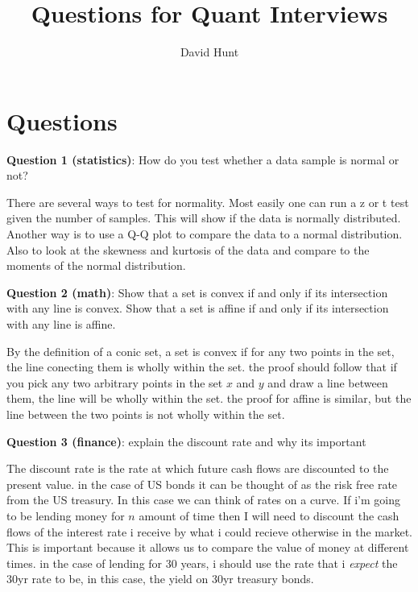 \documentclass[a4paper,10pt]{article}
\title{Questions for Quant Interviews} %
\author{David Hunt} %
\begin{document}
\maketitle

\section*{Questions}

\textbf{Question 1 (statistics)}: How do you test whether a data sample is normal or not?
\vspace{0.25cm} 
\noindent
\begin{sloppypar}
        There are several ways to test for normality. Most easily one can run a z or t test given the number of samples. 
        This will show if the data is normally distributed. Another way is to use a Q-Q plot to compare the data to a normal distribution.
        Also to look at the skewness and kurtosis of the data and compare to the moments of the normal distribution.
\end{sloppypar}
\vspace{0.5cm} 
\noindent
\textbf{Question 2 (math)}: Show that a set is convex if and only if its intersection with any line is convex. Show that a set is affine if and only if its intersection with any line is affine.
\vspace{0.25cm} 
\noindent
\begin{sloppypar}
        By the definition of a conic set, a set is convex if for any two points in the set, the line conecting them is wholly within the set.
        the proof should follow that if you pick any two arbitrary points in the set $x$ and $y$ and draw a line between them, the line will be wholly within the set.
        the proof for affine is similar, but the line between the two points is not wholly within the set.
\end{sloppypar}
\vspace{0.5cm} 
\noindent
\textbf{Question 3 (finance)}: explain the discount rate and why its important 
\vspace{0.25cm}
\noindent
\begin{sloppypar}
        The discount rate is the rate at which future cash flows are discounted to the present value. in the case of US bonds
        it can be thought of as the risk free rate from the US treasury. In this case we can think of rates on a curve.
        If i'm going to be lending money for $n$ amount of time then I will need to discount the cash flows of the interest rate i receive by what i could recieve otherwise in the market.
        This is important because it allows us to compare the value of money at different times.
        in the case of lending for 30 years, i should use the rate that i \textit{expect} the 30yr rate to be, in this case, the yield on 30yr treasury bonds. 
\end{sloppypar}
\end{document}
